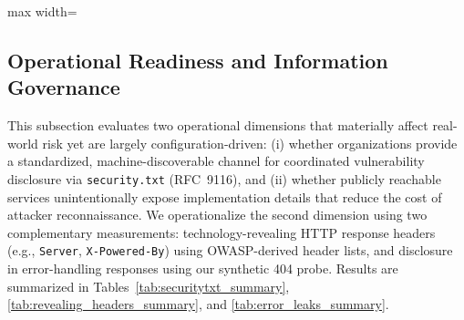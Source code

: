 \documentclass[a4paper,fleqn]{cas-sc}
\begin{document}
\begin{table}[t]
    \caption{Cookie security flag adoption by country and sector.}
    \label{tab:cookie_security_flags}
    \centering
    \scriptsize
    \setlength{\tabcolsep}{3pt}
    \renewcommand{\arraystretch}{1.15}
    
    \begin{adjustbox}{max width=\columnwidth}
    \end{adjustbox}
  \end{table}

 \subsection{Operational Readiness and Information Governance}
 \label{sec:ops_readiness_info_gov}

    This subsection evaluates two operational dimensions that materially affect real-world risk yet are largely configuration-driven: 
    (i) whether organizations provide a standardized, machine-discoverable channel for coordinated vulnerability disclosure via \texttt{security.txt} (RFC~9116), and 
    (ii) whether publicly reachable services unintentionally expose implementation details that reduce the cost of attacker reconnaissance. 
    We operationalize the second dimension using two complementary measurements: technology-revealing HTTP response headers (e.g., \texttt{Server}, \texttt{X-Powered-By}) using OWASP-derived header lists, and disclosure in error-handling responses using our synthetic 404 probe. 
    Results are summarized in Tables~\ref{tab:securitytxt_summary}, \ref{tab:revealing_headers_summary}, and \ref{tab:error_leaks_summary}.
\end{document}
